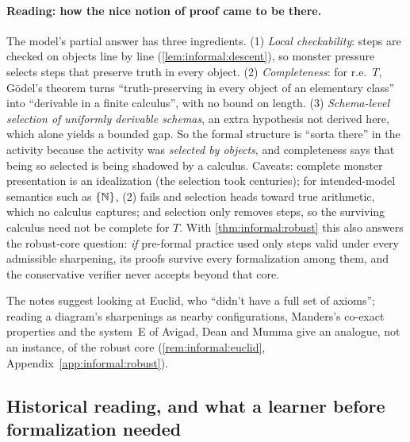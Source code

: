 \paragraph{Reading: how the nice notion of proof came to be there.}
The model's partial answer has three ingredients. (1) \emph{Local checkability}: steps are checked on objects line by line (\cref{lem:informal:descent}), so monster pressure selects steps that preserve truth in every object. (2) \emph{Completeness}: for r.e.\ $T$, Gödel's theorem turns ``truth-preserving in every object of an elementary class'' into ``derivable in a finite calculus'', with no bound on length. (3) \emph{Schema-level selection of uniformly derivable schemas}, an extra hypothesis not derived here, which alone yields a bounded gap. So the formal structure is ``sorta there'' in the activity because the activity was \emph{selected by objects}, and completeness says that being so selected is being shadowed by a calculus. Caveats: complete monster presentation is an idealization (the selection took centuries); for intended-model semantics such as $\{\mathbb{N}\}$, (2) fails and selection heads toward true arithmetic, which no calculus captures; and selection only removes steps, so the surviving calculus need not be complete for $T$. With \cref{thm:informal:robust} this also answers the robust-core question: \emph{if} pre-formal practice used only steps valid under every admissible sharpening, its proofs survive every formalization among them, and the conservative verifier never accepts beyond that core.

The notes suggest looking at Euclid, who ``didn't have a full set of axioms''; reading a diagram's sharpenings as nearby configurations, Manders's co-exact properties and the system~E of Avigad, Dean and Mumma give an analogue, not an instance, of the robust core (\cref{rem:informal:euclid}, Appendix~\ref{app:informal:robust}).

\subsection{Historical reading, and what a learner before formalization needed}\label{sec:informal:history}

